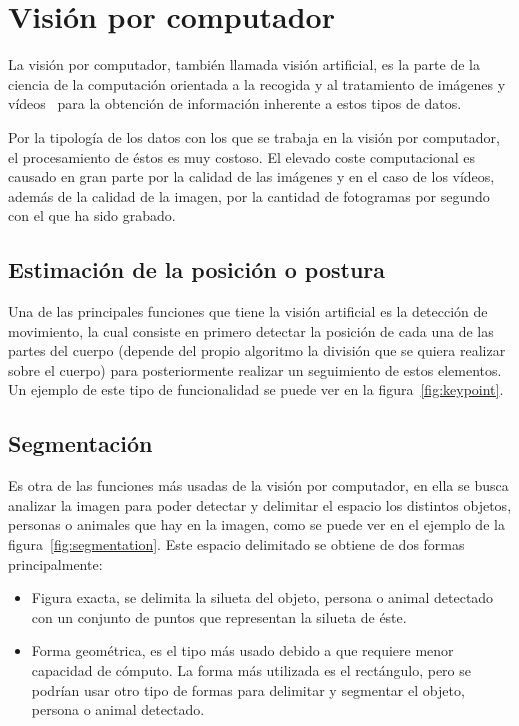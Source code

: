 \section{Visión por computador}
La visión por computador, también llamada visión artificial, es la parte de la ciencia de la computación orientada a la recogida y al tratamiento de imágenes y vídeos~\cite{wiki:visionartifical,cnn} para la obtención de información inherente a estos tipos de datos.

Por la tipología de los datos con los que se trabaja en la visión por computador, el procesamiento de éstos es muy costoso. El elevado coste computacional es causado en gran parte por la calidad de las imágenes y en el caso de los vídeos, además de la calidad de la imagen, por la cantidad de fotogramas por segundo con el que ha sido grabado.

\subsection{Estimación de la posición o postura}
Una de las principales funciones que tiene la visión artificial es la detección de movimiento, la cual consiste en primero detectar la posición de cada una de las partes del cuerpo (depende del propio algoritmo la división que se quiera realizar sobre el cuerpo) para posteriormente realizar un seguimiento de estos elementos. Un ejemplo de este tipo de funcionalidad se puede ver en la figura~\ref{fig:keypoint}.

\subsection{Segmentación}
Es otra de las funciones más usadas de la visión por computador, en ella se busca analizar la imagen para poder detectar y delimitar el espacio los distintos objetos, personas o animales que hay en la imagen, como se puede ver en el ejemplo de la figura~\ref{fig:segmentation}. Este espacio delimitado se obtiene de dos formas principalmente:
\begin{itemize}
	\item Figura exacta, se delimita la silueta del objeto, persona o animal detectado con un conjunto de puntos que representan la silueta de éste.
	\item Forma geométrica, es el tipo más usado debido a que requiere menor capacidad de cómputo. La forma más utilizada es el rectángulo, pero se podrían usar otro tipo de formas para delimitar y segmentar el objeto, persona o animal detectado.
\end{itemize}

